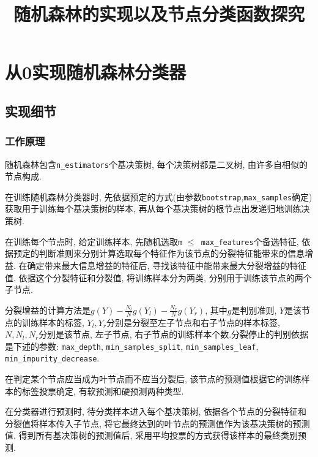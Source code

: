 \documentclass[a4paper]{article}
\title{随机森林的实现以及节点分类函数探究
}
\begin{document}
\maketitle



\section{从0实现随机森林分类器}

\subsection{实现细节}
\subsubsection{工作原理}
随机森林包含\texttt{n\_estimators}个基决策树, 每个决策树都是二叉树, 由许多自相似的节点构成. 

在训练随机森林分类器时, 先依据预定的方式(由参数\texttt{bootstrap},\texttt{max\_samples}确定)获取用于训练每个基决策树的样本, 再从每个基决策树的根节点出发递归地训练决策树.

在训练每个节点时, 给定训练样本, 先随机选取\texttt{m} $\leq$\texttt{ max\_features}个备选特征, 依据预定的判断准则来分别计算选取每个特征作为该节点的分裂特征能带来的信息增益. 在确定带来最大信息增益的特征后, 寻找该特征中能带来最大分裂增益的特征值. 依据这个分裂特征和分裂值, 将训练样本分为两类, 分别用于训练该节点的两个子节点. 

分裂增益的计算方法是$ g(Y)-\frac{N_l}{N}g(Y_l)-\frac{N_r}{N}g(Y_r) $, 其中$g$是判别准则, $Y$是该节点的训练样本的标签,  $Y_l,Y_r$分别是分裂至左子节点和右子节点的样本标签, $N,N_l,N_r$分别是该节点, 左子节点, 右子节点的训练样本个数.分裂停止的判别依据是下述的参数: \texttt{max\_depth}, \texttt{min\_samples\_split}, \texttt{min\_samples\_leaf},  \texttt{min\_impurity\_decrease}.

在判定某个节点应当成为叶节点而不应当分裂后, 该节点的预测值根据它的训练样本的标签投票确定, 有软预测和硬预测两种类型.

在分类器进行预测时, 待分类样本进入每个基决策树, 依据各个节点的分裂特征和分裂值将样本传入子节点, 将它最终达到的叶节点的预测值作为该基决策树的预测值. 得到所有基决策树的预测值后, 采用平均投票的方式获得该样本的最终类别预测.
\end{document}
